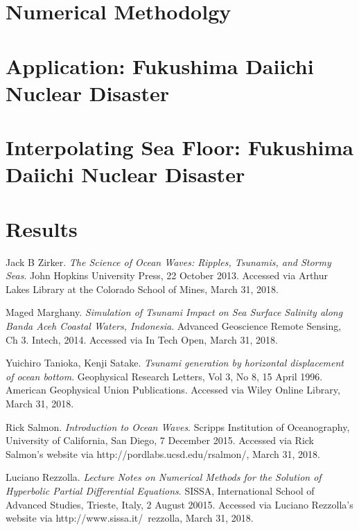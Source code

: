 \documentclass[12pt,a4]{article}
\begin{document}
\section{Numerical Methodolgy}


\section{Application: Fukushima Daiichi Nuclear Disaster}


\section{Interpolating Sea Floor: Fukushima Daiichi Nuclear Disaster}


\section{Results }

\begin{thebibliography}{1}
Jack B Zirker.
\textit{The Science of Ocean Waves: Ripples, Tsunamis, and Stormy Seas}.
John Hopkins University Press, 22 October 2013. 
Accessed via Arthur Lakes Library at the Colorado School of Mines, March 31, 2018.
    
Maged Marghany.
\textit{Simulation of Tsunami Impact on Sea Surface Salinity along Banda Aceh Coastal Waters, Indonesia}.
Advanced Geoscience Remote Sensing, Ch 3. Intech, 2014. Accessed via In Tech Open, March 31, 2018.
    
Yuichiro Tanioka, Kenji Satake.
\textit{Tsunami generation by horizontal displacement of ocean bottom}.
Geophysical Research Letters, Vol 3, No 8, 15 April 1996. American Geophysical Union Publications. Accessed via Wiley Online Library, March 31, 2018.

Rick Salmon.
\textit{Introduction to Ocean Waves}.
Scripps Institution of Oceanography, University of California, San Diego, 7 December 2015. Accessed via Rick Salmon's website via http://pordlabs.ucsd.edu/rsalmon/, March 31, 2018.

Luciano Rezzolla.
\textit{Lecture Notes on Numerical Methods for the Solution of Hyperbolic Partial Differential Equations}.
SISSA, International School of Advanced Studies, Trieste, Italy, 2 August 20015. Accessed via Luciano Rezzolla's website via http://www.sissa.it/~rezzolla, March 31, 2018.

\end{thebibliography}
	
\end{document}
